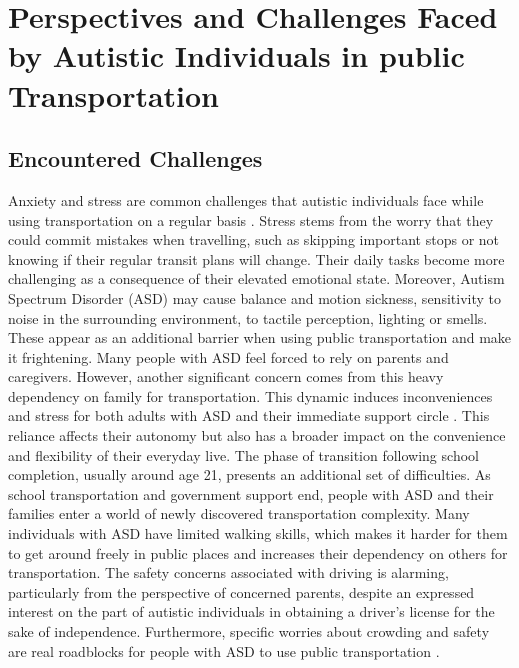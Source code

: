 \section{Perspectives and Challenges Faced by Autistic Individuals in public Transportation}
    
\subsection{Encountered Challenges}

    Anxiety and stress are common challenges that autistic individuals face while using transportation on a regular basis \cite{haas_experiences_nodate}. Stress stems from the worry that they could commit mistakes when travelling, such as skipping important stops or not knowing if their regular transit plans will change. Their daily tasks become more challenging as a consequence of their elevated emotional state. 
    Moreover, Autism Spectrum Disorder (ASD) may cause balance and motion sickness, sensitivity to noise in the surrounding environment, to tactile perception, lighting or smells. These appear as an additional barrier when using public transportation and make it frightening.
\newline
\newline
    Many people with ASD feel forced to rely on parents and caregivers. However, another significant concern comes from this heavy dependency on family for transportation. This dynamic induces inconveniences and stress for both adults with ASD and their immediate support circle \cite{deka_co-principal_nodate}. This reliance affects their autonomy but also has a broader impact on the convenience and flexibility of their everyday live. 
    The phase of transition following school completion, usually around age 21, presents an additional set of difficulties. As school transportation and government support end,  people with ASD and their families enter a world of newly discovered transportation complexity.
    Many individuals with ASD have limited walking skills, which makes it harder for them to get around freely in public places and increases their dependency on others for transportation.
    The safety concerns associated with driving is alarming, particularly from the perspective of concerned parents, despite an expressed interest on the part of autistic individuals in obtaining a driver's license for the sake of independence. 
\newline
\newline
    Furthermore, specific worries about crowding and safety are real roadblocks for people with ASD to use public transportation \cite{falkmer_viewpoints_2015}.
    

